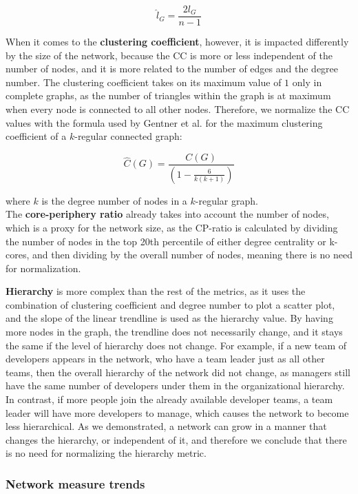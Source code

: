 \[ \hat{l}_G = \frac{2l_G}{n-1} \]

When it comes to the \textbf{clustering coefficient}, however, it is impacted differently by the size of the network, because the CC is more or less independent of the number of nodes, and it is more related to the number of edges and the degree number. The clustering coefficient takes on its maximum value of $1$ only in complete graphs, as the number of triangles within the graph is at maximum when every node is connected to all other nodes. Therefore, we normalize the CC values with the formula used by Gentner et al. \cite{gentnerLargeValuesClustering2016} for the maximum clustering coefficient of a $k$-regular connected graph:

\[ \hat{C}(G) = \frac{C(G)}{(1-\frac{6}{k(k+1)})}\]

where $k$ is the degree number of nodes in a $k$-regular graph. \\

The \textbf{core-periphery ratio} already takes into account the number of nodes, which is a proxy for the network size, as the CP-ratio is calculated by dividing the number of nodes in the top 20th percentile of either degree centrality or k-cores, and then dividing by the overall number of nodes, meaning there is no need for normalization.

\textbf{Hierarchy} is more complex than the rest of the metrics, as it uses the combination of clustering coefficient and degree number to plot a scatter plot, and the slope of the linear trendline is used as the hierarchy value. By having more nodes in the graph, the trendline does not necessarily change, and it stays the same if the level of hierarchy does not change. For example, if a new team of developers appears in the network, who have a team leader just as all other teams, then the overall hierarchy of the network did not change, as managers still have the same number of developers under them in the organizational hierarchy. In contrast, if more people join the already available developer teams, a team leader will have more developers to manage, which causes the network to become less hierarchical. As we demonstrated, a network can grow in a manner that changes the hierarchy, or independent of it, and therefore we conclude that there is no need for normalizing the hierarchy metric.

\subsubsection{Network measure trends}

